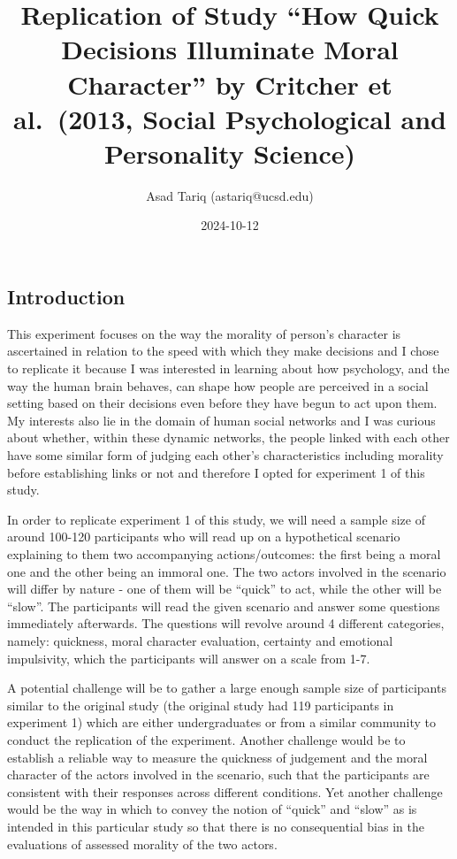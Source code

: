 \documentclass[
  letterpaper,
  DIV=11,
  numbers=noendperiod]{scrartcl}
\title{Replication of Study ``How Quick Decisions Illuminate Moral
Character'' by Critcher et al.~(2013, Social Psychological and
Personality Science)}
\author{Asad Tariq (astariq@ucsd.edu)}
\date{2024-10-12}
\renewcommand*\contentsname{Table of contents}
\newcommand\contentsname{Table of contents}
\begin{document}
\maketitle

\renewcommand*\contentsname{Table of contents}
{
\hypersetup{linkcolor=}
\setcounter{tocdepth}{3}
\tableofcontents
}

\subsection{Introduction}\label{introduction}

This experiment focuses on the way the morality of person's character is
ascertained in relation to the speed with which they make decisions and
I chose to replicate it because I was interested in learning about how
psychology, and the way the human brain behaves, can shape how people
are perceived in a social setting based on their decisions even before
they have begun to act upon them. My interests also lie in the domain of
human social networks and I was curious about whether, within these
dynamic networks, the people linked with each other have some similar
form of judging each other's characteristics including morality before
establishing links or not and therefore I opted for experiment 1 of this
study.

In order to replicate experiment 1 of this study, we will need a sample
size of around 100-120 participants who will read up on a hypothetical
scenario explaining to them two accompanying actions/outcomes: the first
being a moral one and the other being an immoral one. The two actors
involved in the scenario will differ by nature - one of them will be
``quick'' to act, while the other will be ``slow''. The participants
will read the given scenario and answer some questions immediately
afterwards. The questions will revolve around 4 different categories,
namely: quickness, moral character evaluation, certainty and emotional
impulsivity, which the participants will answer on a scale from 1-7.

A potential challenge will be to gather a large enough sample size of
participants similar to the original study (the original study had 119
participants in experiment 1) which are either undergraduates or from a
similar community to conduct the replication of the experiment. Another
challenge would be to establish a reliable way to measure the quickness
of judgement and the moral character of the actors involved in the
scenario, such that the participants are consistent with their responses
across different conditions. Yet another challenge would be the way in
which to convey the notion of ``quick'' and ``slow'' as is intended in
this particular study so that there is no consequential bias in the
evaluations of assessed morality of the two actors.
\end{document}
